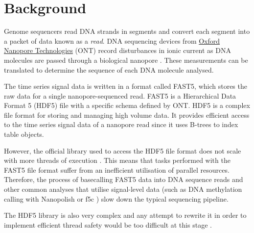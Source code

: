 \section{Background}
\label{sec:back}

Genome sequencers read DNA strands in segments and convert each segment into a packet of data known as a \textit{read}. DNA sequencing devices from \href{https://nanoporetech.com/}{Oxford Nanopore Technologies} (ONT) record disturbances in ionic current as DNA molecules are passed through a biological nanopore \cite{fast5}. These measurements can be translated to determine the sequence of each DNA molecule analysed.

The time series signal data is written in a format called FAST5, which stores the raw data for a single nanopore-sequenced read. FAST5 is a Hierarchical Data Format 5 (HDF5) file \cite{hdf5:specs} with a specific schema defined by ONT. HDF5 is a complex file format for storing and managing high volume data. It provides efficient access to the time series signal data of a nanopore read since it uses B-trees to index table objects.

However, the official library used to access the HDF5 file format does not scale with more threads of execution \cite{hdf5:nomulti}. This means that tasks performed with the FAST5 file format suffer from an inefficient utilisation of parallel resources. Therefore, the process of basecalling FAST5 data into DNA sequence reads and other common analyses that utilise signal-level data (such as DNA methylation calling with Nanopolish \cite{nanopolish} or f5c \cite{f5c}) slow down the typical sequencing pipeline.

The HDF5 library is also very complex and any attempt to rewrite it in order to implement efficient thread safety would be too difficult at this stage \cite{hdf5:nomulti}.
